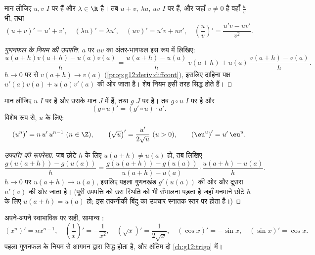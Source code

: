 \begin{proposition}[संक्रियाएँ]\label{prop:g12:deriv:operations}
मान लीजिए $u, v$ $I$ पर  हैं और $\lambda \in \R$ है। तब $u + v$, $\lambda u$, $uv$ $I$ पर
 हैं, और जहाँ $v \neq 0$ है वहाँ $\frac{u}{v}$ भी, तथा
\[
(u+v)' = u' + v', \quad (\lambda u)' = \lambda u', \quad
(uv)' = u'v + uv', \quad
\left(\frac{u}{v}\right)' = \frac{u'v - uv'}{v^2}.
\]
\end{proposition}

\begin{proof}[गुणनफल के नियम की उपपत्ति]
$a$ पर $uv$ का अंतर-भागफल इस रूप में लिखिए:
\[
\frac{u(a+h)v(a+h) - u(a)v(a)}{h}
= \frac{u(a+h) - u(a)}{h}\,v(a+h) + u(a)\,\frac{v(a+h) - v(a)}{h}.
\]
$h \to 0$ पर  से $v(a+h) \to v(a)$ (\cref{prop:g12:deriv:diffcont}), इसलिए दाहिना पक्ष $u'(a)v(a) + u(a)v'(a)$ की ओर जाता है। शेष
नियम इसी तरह सिद्ध होते हैं।
\end{proof}

\begin{theorem}[शृंखला नियम]\label{thm:g12:deriv:chain}
मान लीजिए $u$ $I$ पर  है और उसके मान $J$ में हैं, तथा $g$ $J$ पर
 है। तब $g \circ u$ $I$ पर  है और
\[
(g \circ u)' = (g' \circ u) \cdot u' .
\]
विशेष रूप से,  $u$ के लिए:
\[
(u^n)' = n\,u'\,u^{n-1} \ (n \in \Z), \qquad
\left(\sqrt{u}\right)' = \frac{u'}{2\sqrt{u}} \ (u > 0), \qquad
\left(\eu^{u}\right)' = u'\,\eu^{u}.
\]
\end{theorem}

\begin{proof}[उपपत्ति की रूपरेखा]
जब छोटे $h$ के लिए $u(a+h) \neq u(a)$ हो, तब लिखिए
\[
\frac{g(u(a+h)) - g(u(a))}{h}
= \frac{g(u(a+h)) - g(u(a))}{u(a+h) - u(a)} \cdot \frac{u(a+h) - u(a)}{h}.
\]
$h \to 0$ पर $u(a+h) \to u(a)$, इसलिए पहला गुणनखंड $g'(u(a))$ की ओर और दूसरा $u'(a)$ की ओर जाता है।
(पूरी उपपत्ति को उस स्थिति को भी सँभालना पड़ता है जहाँ मनमाने छोटे $h$ के लिए
$u(a+h) = u(a)$ हो; इस तकनीकी बिंदु का उपचार स्नातक स्तर पर होता है।)
\end{proof}

\begin{example}
अपने-अपने स्वाभाविक  पर सही, सामान्य :
\[
(x^n)' = nx^{n-1}, \quad
\left(\frac{1}{x}\right)' = -\frac{1}{x^2}, \quad
(\sqrt{x})' = \frac{1}{2\sqrt{x}}, \quad
(\cos x)' = -\sin x, \quad
(\sin x)' = \cos x .
\]
पहला गुणनफल के नियम से आगमन द्वारा सिद्ध होता है, और अंतिम दो \cref{ch:g12:trigo} में।
\end{example}

